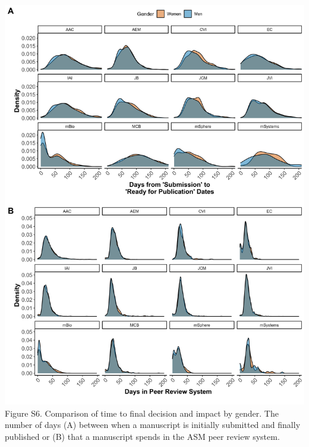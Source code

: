 \documentclass[11pt,]{article}
\begin{document}
\includegraphics{Figure_S6.png} Figure S6. Comparison of time to final
decision and impact by gender. The number of days (A) between when a
manuscript is initially submitted and finally published or (B) that a
manuscript spends in the ASM peer review system.

\newpage
\end{document}
